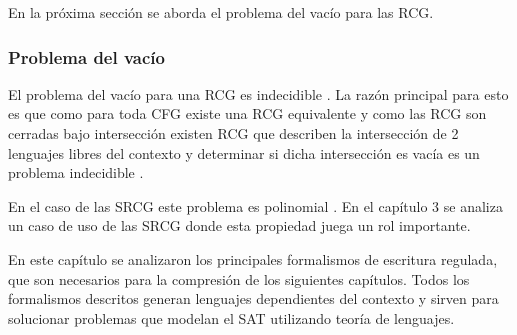 En la próxima sección se aborda el problema del vacío para las RCG.
\subsubsection{Problema del vacío}

El problema del vacío para una RCG es indecidible \cite{propertiesRCGBib}.
La razón principal para esto es que como para toda CFG existe una RCG equivalente y como las RCG son cerradas
bajo intersección existen RCG que describen la intersección de 2 lenguajes libres del contexto y determinar
si dicha intersección es vacía es un problema indecidible \cite{propertiesRCGBib}.

En el caso de las SRCG este problema es polinomial \cite{mainRCGBib}. En el capítulo 3 se analiza un caso de uso de las
SRCG donde esta propiedad juega un rol importante.

En este capítulo se analizaron los principales formalismos de escritura regulada, que son necesarios para la compresión de
los siguientes capítulos. Todos los formalismos descritos generan lenguajes dependientes del contexto y sirven para
solucionar problemas que modelan el SAT utilizando teoría de lenguajes.
